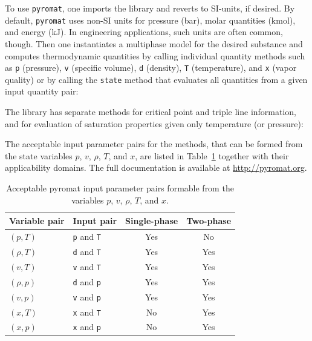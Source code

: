 To use \verb|pyromat|, one imports the library and reverts to SI-units, if desired. By default, \verb|pyromat| uses non-SI units for pressure (bar), molar quantities (kmol), and energy (kJ). In engineering applications, such units are often common, though. Then one instantiates a multiphase model for the desired substance and computes thermodynamic quantities by calling individual quantity methods such as \verb|p| (pressure), \verb|v| (specific volume), \verb|d| (density), \verb|T| (temperature), and \verb|x| (vapor quality) or by calling the \verb|state| method that evaluates all quantities from a given input quantity pair: 

The library has separate methods for critical point and triple line information, and for evaluation of saturation properties given only temperature (or pressure):

The acceptable input parameter pairs for the methods, that can be formed from the state variables $p$, $v$, $\rho$, $T$, and $x$, are listed in Table~\ref{tab:pyromat-pvTx-input-pairs} together with their applicability domains. The full documentation is available at \href{http://pyromat.org}{http://pyromat.org}.
\begin{table}[!htb]
    \centering
    \begin{threeparttable}
    \caption{Acceptable pyromat input parameter pairs formable from the variables $p$, $v$, $\rho$, $T$, and $x$.}
    \begin{tabular}{llcc}
    \toprule 
    Variable pair & Input pair & Single-phase & Two-phase\\
    \midrule 
    $(p, T)$ & \texttt{p} and \texttt{T}  & Yes & No \\
    $(\rho, T)$ & \texttt{d} and \texttt{T} & Yes & Yes \\
    $(v, T)$ & \texttt{v} and \texttt{T} & Yes & Yes \\
    $(\rho, p)$ & \texttt{d} and \texttt{p} & Yes & Yes \\
    $(v, p)$ & \texttt{v} and \texttt{p} & Yes & Yes \\
    $(x, T)$ & \texttt{x} and \texttt{T} & No & Yes \\
    $(x, p)$ & \texttt{x} and \texttt{p} & No & Yes \\
    \bottomrule
    \end{tabular}
    \end{threeparttable}
    \label{tab:pyromat-pvTx-input-pairs}
\end{table}

